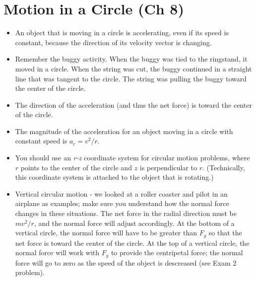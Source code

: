 \section{Motion in a Circle (Ch 8)}
\vspace*{-.15in}
\begin{itemize}

\item An object that is moving in a circle is accelerating, even if
  its speed is constant, because the direction of its velocity vector
  is changing.
\item Remember the buggy activity.  When the buggy was tied to the
  ringstand, it moved in a circle.  When the string was cut, the buggy
  continued in a straight line that was tangent to the circle.  The
  string was pulling the buggy toward the center of the circle.
\item The direction of the acceleration (and thus the net force) is
  toward the center of the circle.
\item The magnitude of the acceleration for an object moving in a
  circle with constant speed is $a_c = v^2/r$.
\item You should use an {\em r-z} coordinate system for circular
  motion problems, where $r$ points to the center of the circle and
  $z$ is perpendicular to $r$.  (Technically, this coordinate system
  is attached to the object that is rotating.)
\item Vertical circular motion - we looked at a roller coaster and
  pilot in an airplane as examples; make sure you understand how the normal force
  changes in these situations.  The net force in the radial direction
  must be $m v^2/r$, and the normal force will adjust accordingly.  At
  the bottom of a vertical circle, the normal force will have to be
  greater than $F_g$ so that the net force is toward the center of the
  circle.  At the top of a vertical circle, the normal force will work
  with $F_g$ to provide the centripetal force; the normal force will
  go to zero as the speed of the object is descreased (see Exam 2 problem).

\end{itemize}

\vspace*{-.15in}
